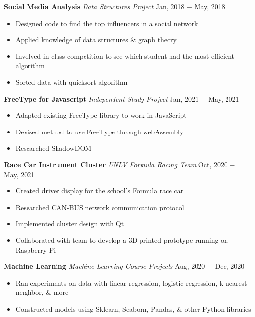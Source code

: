 \documentclass{article}
\begin{document}
\noindent \textbf{Social Media Analysis} \textit{Data Structures Project} \hfill  Jan, 2018 $-$ May, 2018
\begin{itemize}[noitemsep,nolistsep,leftmargin=*]
\item {Designed code to find the top influencers in a social network }
\item {Applied knowledge of data structures \& graph theory}
\item {Involved in class competition to see which student had the most efficient algorithm}
\item {Sorted data with quicksort algorithm \\}
\end{itemize}

\noindent \textbf{FreeType for Javascript} \textit{Independent Study Project} \hfill  Jan, 2021 $-$ May, 2021
\begin{itemize}[noitemsep,nolistsep,leftmargin=*]
\item {Adapted existing FreeType library to work in JavaScript}
\item {Devised method to use FreeType through webAssembly}
\item {Researched ShadowDOM \\}
\end{itemize}

\noindent \textbf{Race Car Instrument Cluster} \textit{UNLV Formula Racing Team} \hfill  Oct, 2020 $-$ May, 2021
\begin{itemize}[noitemsep,nolistsep,leftmargin=*]
\item {Created driver display for the school's Formula race car }
\item {Researched CAN-BUS network communication protocol}
\item {Implemented cluster design with Qt}
\item {Collaborated with team to develop a 3D printed prototype running on Raspberry Pi\\}
\end{itemize}

\noindent \textbf{Machine Learning} \textit{Machine Learning Course Projects} \hfill  Aug, 2020 $-$ Dec, 2020
\begin{itemize}[noitemsep,nolistsep,leftmargin=*]
\item {Ran experiments on data with linear regression, logistic regression, k-nearest neighbor, \& more}
\item {Constructed models using Sklearn, Seaborn, Pandas, \& other Python libraries \\}
\end{itemize}
\end{document}
